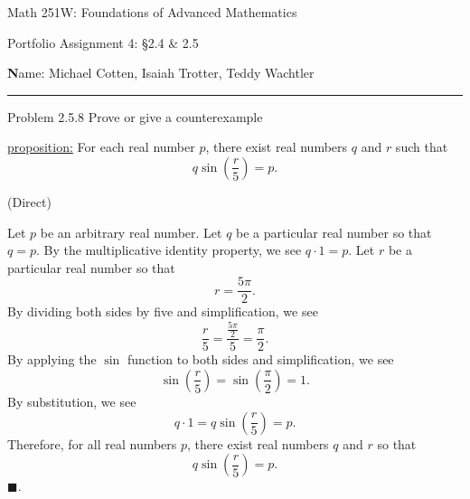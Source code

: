 \documentclass{article}
\theoremstyle{definition}
\renewcommand{\qed}{\blacksquare}
\begin{document}
	\begin{center}
		\Large{Math 251W: Foundations of Advanced Mathematics}

		\normalsize{Portfolio Assignment 4: \S 2.4 \& 2.5}

		\vspace{0.2cm}

		\hfill {\textbf Name:} Michael Cotten, Isaiah Trotter, Teddy Wachtler

		\vspace{0.25cm}
		\hrule
	\end{center}

	\vspace{0.3cm}


	\noindent Problem 2.5.8
	Prove or give a counterexample
	\vspace{0.3cm}

	\underline{proposition:}
	For each real number $p$, there exist real numbers $q$ and $r$ such that \[q\sin\left(\frac{r}{5}\right)=p.\]

	\vspace{0.3cm}
	 (Direct)
	\vspace{0.2cm}

	Let $p$ be an arbitrary real number.
	Let $q$ be a particular real number so that $q = p$.
	By the multiplicative identity property, we see $q \cdot 1 = p$.
	Let $r$ be a particular real number so that \[r = \frac{5\pi}{2}.\]
	By dividing both sides by five and simplification, we see \[\frac{r}{5} = \frac{\frac{5\pi}{2}}{5} = \frac{\pi}{2}.\]
	By applying the $\sin$ function to both sides and simplification, we see \[\sin\left(\frac{r}{5}\right) = \sin\left(\frac{\pi}{2}\right) = 1.\]
	By substitution, we see \[q \cdot 1 = q \sin\left(\frac{r}{5}\right) = p.\]
	Therefore, for all real numbers $p$, there exist real numbers $q$ and $r$ so that \[q\sin\left(\frac{r}{5}\right)=p.\]
	$\qed$.

	\vspace{1cm}

\end{document}
